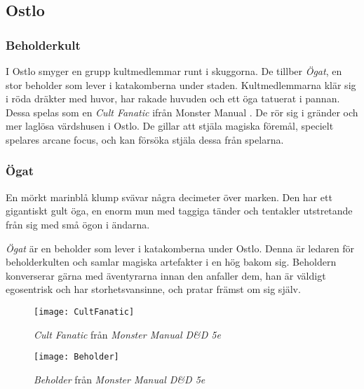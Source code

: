 \subsection{Ostlo}
\subsubsection{Beholderkult}
I Ostlo smyger en grupp kultmedlemmar runt i skuggorna. De tillber \textit{Ögat}, en stor beholder som lever i katakomberna under staden. Kultmedlemmarna klär sig i röda dräkter med huvor, har rakade huvuden och ett öga tatuerat i pannan. Dessa spelas som en \textit{Cult Fanatic} \imagedescribe{\ref{img:cultFanatic}} ifrån Monster Manual \cite{MonsterManual}. De rör sig i gränder och mer laglösa värdshusen i Ostlo. De gillar att stjäla magiska föremål, specielt spelares arcane focus, och kan försöka stjäla dessa från spelarna.
%
\subsubsection{Ögat}
\begin{displayquote}
En mörkt marinblå klump svävar några decimeter över marken. Den har ett gigantiskt gult öga, en enorm mun med taggiga tänder och tentakler utstretande från sig med små ögon i ändarna.
\end{displayquote}
\textit{Ögat} är en beholder \imagedescribe{\ref{img:beholder}} som lever i katakomberna under Ostlo. Denna är ledaren för beholderkulten och samlar magiska artefakter i en hög bakom sig. Beholdern konverserar gärna med äventyrarna innan den anfaller dem, han är väldigt egosentrisk och har storhetsvansinne, och pratar främst om sig själv.

\begin{figure}
	\centering
	\label{img:cultFanatic}
	\texttt{[image: CultFanatic]}
	\caption{\textit{Cult Fanatic} från \textit{Monster Manual D\&D 5e}\cite{MonsterManual}}
\end{figure}

\begin{figure}
	\centering
	\label{img:beholder}
	\texttt{[image: Beholder]}
	\caption{\textit{Beholder} från \textit{Monster Manual D\&D 5e}\cite{MonsterManual}}
\end{figure}

